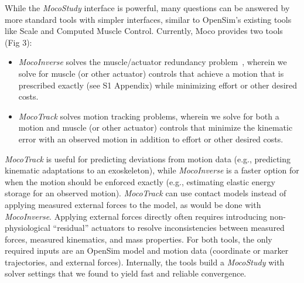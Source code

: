 \documentclass[10pt,letterpaper]{article}
\begin{document}
While the \textit{MocoStudy} interface is powerful, many questions can be answered by more standard tools with simpler interfaces, similar to OpenSim’s existing tools like Scale and Computed Muscle Control. Currently, Moco provides two tools (Fig 3):
\begin{itemize}
\item \textit{\textit{MocoInverse}} solves the muscle/actuator redundancy problem~\cite{Groote:2016dq}, wherein we solve for muscle (or other actuator) controls that achieve a motion that is prescribed exactly (see S1 Appendix) while minimizing effort or other desired costs.
\item \textit{\textit{MocoTrack}} solves motion tracking problems, wherein we solve for both a motion and muscle (or other actuator) controls that minimize the kinematic error with an observed motion in addition to effort or other desired costs.
\end{itemize}
\textit{MocoTrack} is useful for predicting deviations from motion data (e.g., predicting kinematic adaptations to an exoskeleton), while \textit{MocoInverse} is a faster option for when the motion should be enforced exactly (e.g., estimating elastic energy storage for an observed motion). \textit{MocoTrack} can use contact models instead of applying measured external forces to the model, as would be done with \textit{MocoInverse}. Applying external forces directly often requires introducing non-physiological “residual” actuators to resolve inconsistencies between measured forces, measured kinematics, and mass properties. For both tools, the only required inputs are an OpenSim model and motion data (coordinate or marker trajectories, and external forces). Internally, the tools build a \textit{MocoStudy} with solver settings that we found to yield fast and reliable convergence.
\end{document}
